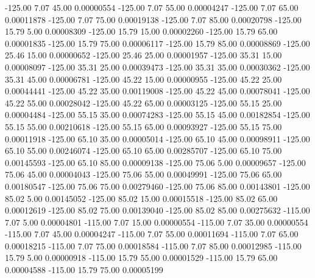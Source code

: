    -125.00      7.07     45.00     0.00000554
   -125.00      7.07     55.00     0.00004247
   -125.00      7.07     65.00     0.00011878
   -125.00      7.07     75.00     0.00019138
   -125.00      7.07     85.00     0.00020798
   -125.00     15.79      5.00     0.00008309
   -125.00     15.79     15.00     0.00002260
   -125.00     15.79     65.00     0.00001835
   -125.00     15.79     75.00     0.00006117
   -125.00     15.79     85.00     0.00008869
   -125.00     25.46     15.00     0.00000652
   -125.00     25.46     25.00     0.00001957
   -125.00     35.31     15.00     0.00008097
   -125.00     35.31     25.00     0.00039473
   -125.00     35.31     35.00     0.00030362
   -125.00     35.31     45.00     0.00006781
   -125.00     45.22     15.00     0.00000955
   -125.00     45.22     25.00     0.00044441
   -125.00     45.22     35.00     0.00119008
   -125.00     45.22     45.00     0.00078041
   -125.00     45.22     55.00     0.00028042
   -125.00     45.22     65.00     0.00003125
   -125.00     55.15     25.00     0.00004484
   -125.00     55.15     35.00     0.00074283
   -125.00     55.15     45.00     0.00182854
   -125.00     55.15     55.00     0.00210618
   -125.00     55.15     65.00     0.00093927
   -125.00     55.15     75.00     0.00011918
   -125.00     65.10     35.00     0.00005014
   -125.00     65.10     45.00     0.00098911
   -125.00     65.10     55.00     0.00246074
   -125.00     65.10     65.00     0.00285707
   -125.00     65.10     75.00     0.00145593
   -125.00     65.10     85.00     0.00009138
   -125.00     75.06      5.00     0.00009657
   -125.00     75.06     45.00     0.00004043
   -125.00     75.06     55.00     0.00049991
   -125.00     75.06     65.00     0.00180547
   -125.00     75.06     75.00     0.00279460
   -125.00     75.06     85.00     0.00143801
   -125.00     85.02      5.00     0.00145052
   -125.00     85.02     15.00     0.00015518
   -125.00     85.02     65.00     0.00012619
   -125.00     85.02     75.00     0.00139040
   -125.00     85.02     85.00     0.00275632
   -115.00      7.07      5.00     0.00004801
   -115.00      7.07     15.00     0.00000554
   -115.00      7.07     35.00     0.00000554
   -115.00      7.07     45.00     0.00004247
   -115.00      7.07     55.00     0.00011694
   -115.00      7.07     65.00     0.00018215
   -115.00      7.07     75.00     0.00018584
   -115.00      7.07     85.00     0.00012985
   -115.00     15.79      5.00     0.00000918
   -115.00     15.79     55.00     0.00001529
   -115.00     15.79     65.00     0.00004588
   -115.00     15.79     75.00     0.00005199
